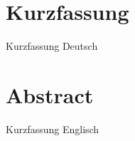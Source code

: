 \chapter*{Kurzfassung} \label{chap:Kurzfassung}
\thispagestyle{plain}
Kurzfassung Deutsch

\cleardoublepage
\chapter*{Abstract} \label{chap:abstract}
\thispagestyle{plain}
Kurzfassung Englisch